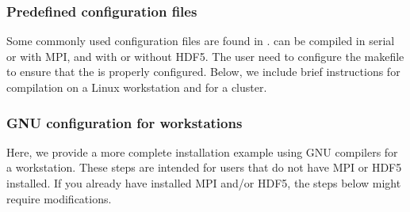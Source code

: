 \documentclass[letterpaper,10pt,english]{sphinxmanual}
\begin{document}
\subsubsection{Pre\sphinxhyphen{}defined configuration files}
\label{\detokenize{Base/Installation:pre-defined-configuration-files}}
Some commonly used configuration files are found in .
 can be compiled in serial or with MPI, and with or without HDF5.
The user need to configure the  makefile to ensure that the  is properly configured.
Below, we include brief instructions for compilation on a Linux workstation and for a cluster.


\subsubsection{GNU configuration for workstations}
\label{\detokenize{Base/Installation:gnu-configuration-for-workstations}}
Here, we provide a more complete installation example using GNU compilers for a workstation.
These steps are intended for users that do not have MPI or HDF5 installed.
If you already have installed MPI and/or HDF5, the steps below might require modifications.
\end{document}
